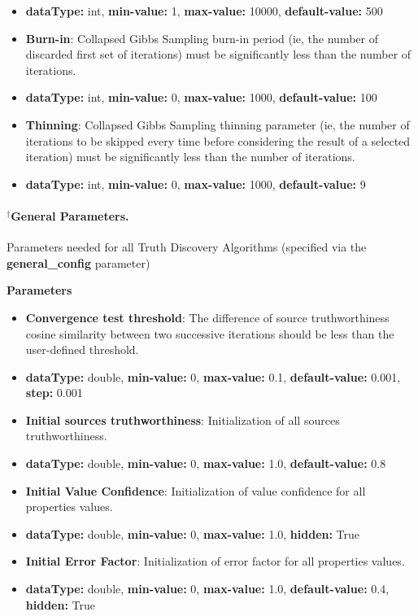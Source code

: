 \documentclass[a4paper,10pt]{scrartcl}
\begin{document}
\begin{description}
\begin{itemize}
\item[]\textbf{dataType: }int, \textbf{min-value: }1, \textbf{max-value: }10000, \textbf{default-value: }500\item \textbf{Burn-in}: Collapsed Gibbs Sampling burn-in period (ie, the number of discarded first set of iterations) must be significantly less than the number of iterations.
\item[]\textbf{dataType: }int, \textbf{min-value: }0, \textbf{max-value: }1000, \textbf{default-value: }100\item \textbf{Thinning}: Collapsed Gibbs Sampling thinning parameter (ie, the number of iterations to be skipped every time before considering the result of a selected iteration) 
must be significantly less than the number of iterations.
\item[]\textbf{dataType: }int, \textbf{min-value: }0, \textbf{max-value: }1000, \textbf{default-value: }9\end{itemize}
\end{description}
\paragraph*{$^{\dagger}$General Parameters.}
Parameters needed for all Truth Discovery Algorithms (specified via the \textbf{general\_config} parameter)
\begin{description}
\item \textbf{Parameters}
\begin{itemize}
\item \textbf{Convergence test threshold}: The difference of source truthworthiness cosine similarity between two successive iterations should be less than the user-defined threshold.
\item[]\textbf{dataType: }double, \textbf{min-value: }0, \textbf{max-value: }0.1, \textbf{default-value: }0.001, \textbf{step: }0.001\item \textbf{Initial sources truthworthiness}: Initialization of all sources truthworthiness.
\item[]\textbf{dataType: }double, \textbf{min-value: }0, \textbf{max-value: }1.0, \textbf{default-value: }0.8\item \textbf{Initial Value Confidence}: Initialization of value confidence for all properties values.
\item[]\textbf{dataType: }double, \textbf{min-value: }0, \textbf{max-value: }1.0, \textbf{hidden: }True
\item \textbf{Initial Error Factor}: Initialization of error factor for all properties values.
\item[]\textbf{dataType: }double, \textbf{min-value: }0, \textbf{max-value: }1.0, \textbf{default-value: }0.4, \textbf{hidden: }True
\end{itemize}
\end{description}
\end{document}
